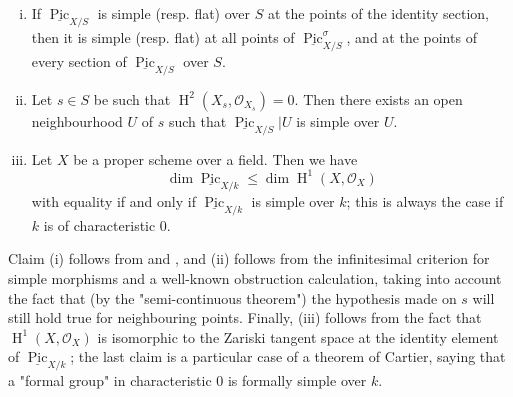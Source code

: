 \begin{proposition}\label{fga3.vi-2-proposition-2.10}
    ~
    \begin{enumerate}[i.]
        \item If $\underline{\operatorname{Pic}}_{X/S}$ is simple (resp. flat) over $S$ at the points of the identity section, then it is simple (resp. flat) at all points of $\underline{\operatorname{Pic}}_{X/S}^\sigma$, and at the points of every section of $\underline{\operatorname{Pic}}_{X/S}$ over $S$.
        \item Let $s\in S$ be such that $\operatorname{H}^2(X_s,\mathcal{O}_{X_s})=0$.
              Then there exists an open neighbourhood $U$ of $s$ such that $\underline{\operatorname{Pic}}_{X/S}|U$ is simple over $U$.
        \item Let $X$ be a proper scheme over a field.
              Then we have
              \[
                  \dim\underline{\operatorname{Pic}}_{X/k}
                  \leqslant \dim\operatorname{H}^1(X,\mathcal{O}_X)
              \]
              with equality if and only if $\underline{\operatorname{Pic}}_{X/k}$ is simple over $k$;
              this is always the case if $k$ is of characteristic $0$.
    \end{enumerate}
\end{proposition}

\begin{cproof}
    Claim (i) follows from  and , and (ii) follows from the infinitesimal criterion for simple morphisms and a well-known obstruction calculation, taking into account the fact that (by the "semi-continuous theorem") the hypothesis made on $s$ will still hold true for neighbouring points.
    Finally, (iii) follows from the fact that $\operatorname{H}^1(X,\mathcal{O}_X)$ is isomorphic to the Zariski tangent space at the identity element of $\underline{\operatorname{Pic}}_{X/k}$;
    the last claim is a particular case of a theorem of Cartier, saying that a "formal group" in characteristic $0$ is formally simple over $k$.
\end{cproof}